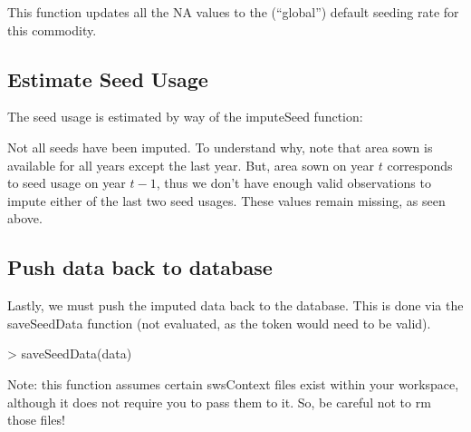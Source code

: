 \documentclass[nojss]{jss}
\begin{document}
This function updates all the NA values to the (``global'') default seeding
rate for this commodity.

\subsection{Estimate Seed Usage}

The seed usage is estimated by way of the imputeSeed function:

Not all seeds have been imputed.  To understand why, note that area
sown is available for all years except the last year.  But, area sown on year
$t$ corresponds to seed usage on year $t-1$, thus we don't have enough
valid observations to impute either of the last two seed usages.  These values
remain missing, as seen above.

\subsection{Push data back to database}

Lastly, we must push the imputed data back to the database.  This is done via
the saveSeedData function (not evaluated, as the token would need to be valid).

\begin{Schunk}
\begin{Sinput}
> saveSeedData(data)
\end{Sinput}
\end{Schunk}

Note: this function assumes certain swsContext files exist within your
workspace, although it does not require you to pass them to it.  So, be careful
not to rm those files!
\end{document}
